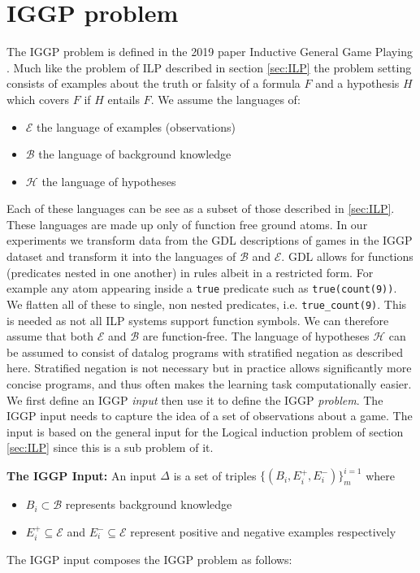 \chapter{IGGP problem}
\label{ch:IGGP}

The IGGP problem is defined in the 2019 paper Inductive General Game Playing \cite{Cropper/IGGP}. Much like the problem of ILP described in section \ref{sec:ILP} the problem setting consists of examples about the truth or falsity of a formula $F$ and a hypothesis $H$ which covers $F$ if $H$ entails $F$. We assume the languages of:
\begin{itemize}
\item $\mathscr{E}$ the language of examples (observations)
\item $\mathscr{B}$ the language of background knowledge
\item $\mathscr{H}$ the language of hypotheses
\end{itemize} 
Each of these languages can be see as a subset of those described in \ref{sec:ILP}. These languages are made up only of function free ground atoms. In our experiments we transform data from the GDL descriptions of games in the IGGP dataset and transform it into the languages of $\mathscr{B}$ and $\mathscr{E}$. GDL allows for functions (predicates nested in one another) in rules albeit in a restricted form. For example any atom appearing inside a \texttt{true} predicate such as \texttt{true(count(9))}. We flatten all of these to single, non nested predicates, i.e. \verb|true_count(9)|. This is needed as not all ILP systems support function symbols. We can therefore assume that both $\mathscr{E}$ and $\mathscr{B}$ are function-free. The language of hypotheses $\mathscr{H}$ can be assumed to consist of datalog programs with stratified negation as described here\cite{Kenneth}. Stratified negation is not necessary but in practice allows significantly more concise programs, and thus often makes the learning task computationally easier. We first define an IGGP \textit{input} then use it to define the IGGP \textit{problem}. The IGGP input needs to capture the idea of a set of observations about a game. The input is based on the general input for the Logical induction problem of section \ref{sec:ILP} since this is a sub problem of it.

\textbf{The IGGP Input:} An input $\Delta$ is a set of triples $\{(B_i,E_i^+,E_i^-)\}_m^{i=1}$ where
\begin{itemize}
\item $B_i \subset \mathscr{B}$ represents background knowledge
\item $E_i^+ \subseteq \mathscr{E}$ and $E_i^- \subseteq \mathscr{E}$ represent positive and negative examples respectively
\end{itemize}
The IGGP input composes the IGGP problem as follows:

